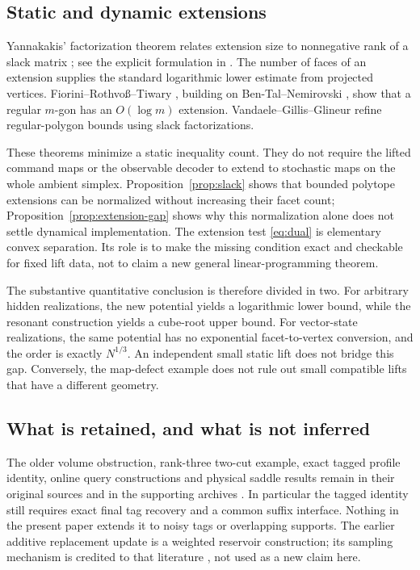 \subsection{Static and dynamic extensions}
Yannakakis' factorization theorem relates extension size to nonnegative
rank of a slack matrix \cite{Yannakakis}; see the explicit formulation in
\cite[Theorem 1]{FRT}. The number of faces of an extension supplies the
standard logarithmic lower estimate from projected vertices.
Fiorini--Rothvo\ss--Tiwary \cite[Theorem 2]{FRT}, building on
Ben-Tal--Nemirovski \cite{BTN}, show that a regular $m$-gon has an
$O(\log m)$ extension. Vandaele--Gillis--Glineur \cite{VGG} refine
regular-polygon bounds using slack factorizations.

These theorems minimize a static inequality count. They do not require
the lifted command maps or the observable decoder to extend to stochastic
maps on the whole ambient simplex. Proposition~\ref{prop:slack} shows
that bounded polytope extensions can be normalized without increasing
their facet count; Proposition~\ref{prop:extension-gap} shows why this
normalization alone does not settle dynamical implementation.
The extension test \eqref{eq:dual} is elementary convex separation.
Its role is to make the missing condition exact and checkable for fixed
lift data, not to claim a new general linear-programming theorem.

The substantive quantitative conclusion is therefore divided in two.
For arbitrary hidden realizations, the new potential yields a logarithmic
lower bound, while the resonant construction yields a cube-root upper
bound. For vector-state realizations, the same potential has no
exponential facet-to-vertex conversion, and the order is exactly
$N^{1/3}$. An independent small static lift does not bridge this gap.
Conversely, the map-defect example does not rule out small compatible
lifts that have a different geometry.

\subsection{What is retained, and what is not inferred}
The older volume obstruction, rank-three two-cut example, exact tagged
profile identity, online query constructions and physical saddle results
remain in their original sources and in the supporting archives
\cite{GTF31,GTF32}. In particular the tagged identity still requires
exact final tag recovery and a common suffix interface. Nothing in the
present paper extends it to noisy tags or overlapping supports.
The earlier additive replacement update is a weighted reservoir
construction; its sampling mechanism is credited to that literature
\cite[Appendix A.2]{PBRT}, not used as a new claim here.

